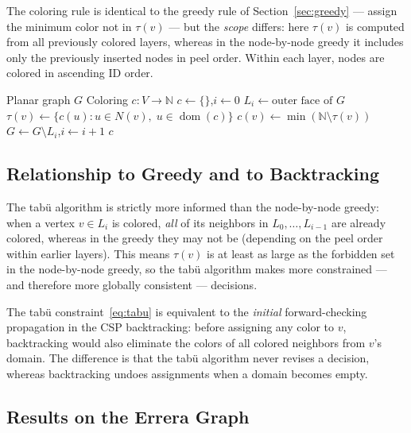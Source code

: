 \documentclass[12pt,letterpaper]{article}
\theoremstyle{plain}
\theoremstyle{definition}
\theoremstyle{remark}
\newcommand{\N}{\mathbb{N}}
\newcommand{\dom}{\operatorname{dom}}
\begin{document}
The coloring rule is identical to the greedy rule of Section~\ref{sec:greedy}
— assign the minimum color not in $\tau(v)$ — but the \emph{scope} differs:
here $\tau(v)$ is computed from all previously colored layers, whereas in the
node-by-node greedy it includes only the previously inserted nodes in peel order.
Within each layer, nodes are colored in ascending ID order.

\begin{algorithm}[H]
\caption{Layer-by-layer tab\"{u} coloring}
\label{alg:tabu}
\begin{algorithmic}[1]
\Require Planar graph $G$
\Ensure Coloring $c: V \to \N$
\State $c \gets \{\}$,\quad $i \gets 0$
    \State $L_i \gets \text{outer face of } G$ 
        \State $\tau(v) \gets \{c(u) : u \in N(v),\; u \in \dom(c)\}$
        \State $c(v) \gets \min(\N \setminus \tau(v))$
    \EndFor
    \State $G \gets G \setminus L_i$,\quad $i \gets i + 1$
\EndWhile
\State \Return $c$
\end{algorithmic}
\end{algorithm}

\subsection{Relationship to Greedy and to Backtracking}

The tab\"{u} algorithm is strictly more informed than the node-by-node greedy:
when a vertex $v \in L_i$ is colored, \emph{all} of its neighbors in
$L_0, \ldots, L_{i-1}$ are already colored, whereas in the greedy they may not
be (depending on the peel order within earlier layers). This means $\tau(v)$
is at least as large as the forbidden set in the node-by-node greedy, so the
tab\"{u} algorithm makes more constrained — and therefore more globally
consistent — decisions.

The tab\"{u} constraint~\eqref{eq:tabu} is equivalent to the \emph{initial}
forward-checking propagation in the CSP backtracking: before assigning any color
to $v$, backtracking would also eliminate the colors of all colored neighbors
from $v$'s domain. The difference is that the tab\"{u} algorithm never revises
a decision, whereas backtracking undoes assignments when a domain becomes empty.

\subsection{Results on the Errera Graph}
\end{document}

